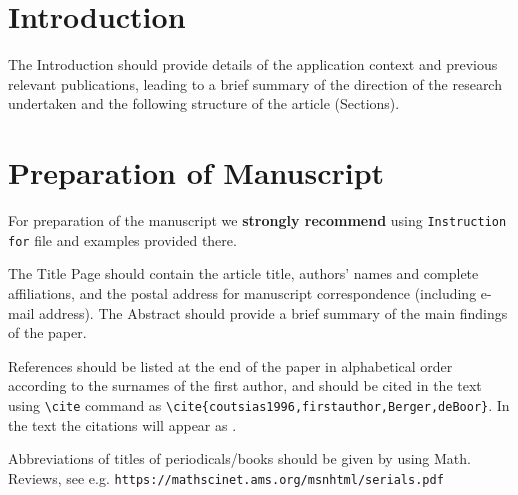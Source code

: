 \documentclass[mathpazo]{csiam-am}
\begin{document}
\begin{abstract}
The abstract should provide the application context and briefly summarise the main findings.
It should not be too long --- normally no longer than half a page.
\end{abstract}


\maketitle





\section{Introduction}
\label{sec1}
The Introduction should provide details of the application context and previous relevant publications, leading to a brief summary of the
direction of the research undertaken and the following structure of the article (Sections).

\section{Preparation of Manuscript}\label{sec2}

For preparation of the manuscript we \textbf{strongly recommend} using {\tt Instruction for} file and examples provided there.

 The Title Page should contain the article title,
authors' names and complete affiliations,
and the postal address for manuscript correspondence (including
e-mail address). The Abstract should provide a brief
summary of the main findings of the paper.

References should be listed at the end of the paper in alphabetical order according to the surnames of the first author, and should be cited in the text using \verb"\cite" command as \verb"\cite{coutsias1996,firstauthor,Berger,deBoor}". In the text the citations will appear as  \cite{coutsias1996,firstauthor,Berger,deBoor}.

Abbreviations of titles of periodicals/books should be given by using Math. Reviews, see e.g. \verb"https://mathscinet.ams.org/msnhtml/serials.pdf"
\end{document}
